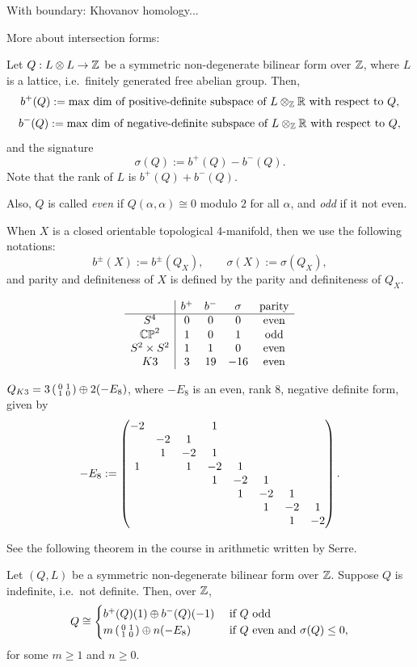 \documentclass{../../../small}
\begin{document}
With boundary: Khovanov homology...


More about intersection forms:
\begin{definition}
Let $Q:L\otimes L\to\Z$ be a symmetric non-degenerate bilinear form over $\Z$, where $L$ is a lattice, i.e.~finitely generated free abelian group.
Then,
\[b^+(Q):=\text{max dim of positive-definite subspace of $L\otimes_\Z\R$ with respect to $Q$},\]
\[b^-(Q):=\text{max dim of negative-definite subspace of $L\otimes_\Z\R$ with respect to $Q$},\]
and the signature
\[\sigma(Q):=b^+(Q)-b^-(Q).\]
Note that the rank of $L$ is $b^+(Q)+b^-(Q)$.

Also, $Q$ is called \emph{even} if $Q(\alpha,\alpha)\cong0$ modulo $2$ for all $\alpha$, and \emph{odd} if it not even.

When $X$ is a closed orientable topological 4-manifold, then we use the following notations:
\[b^\pm(X):=b^\pm(Q_X),\qquad\sigma(X):=\sigma(Q_X),\]
and parity and definiteness of $X$ is defined by the parity and definiteness of $Q_X$.
\end{definition}

\begin{example}
\[\begin{array}{c|cccc}
&b^+&b^-&\sigma&\text{parity}\\\hline
S^4&0&0&0&\text{even}\\
\CP^2&1&0&1&\text{odd}\\
S^2\times S^2&1&1&0&\text{even}\\
K3&3&19&-16&\text{even}
\end{array}\]
\end{example}

\begin{exercise}
$Q_{K3}=3\left(\mat[small]{0&1\\1&0}\right)\oplus2(-E_8)$, where $-E_8$ is an even, rank 8, negative definite form, given by
\[-E_8:=\mat{
-2&&&1&&&&\\
&-2&1&&&&&\\
&1&-2&1&&&&\\
1&&1&-2&1&&&\\
&&&1&-2&1&&\\
&&&&1&-2&1&\\
&&&&&1&-2&1\\
&&&&&&1&-2
}.\]
\end{exercise}
See the following theorem in the course in arithmetic written by Serre.
\begin{theorem}
Let $(Q,L)$ be a symmetric non-degenerate bilinear form over $\Z$.
Suppose $Q$ is indefinite, i.e.~not definite.
Then, over $\Z$,
\[Q\cong\begin{cases}
b^+(Q)(1)\oplus b^-(Q)(-1)&\text{ if $Q$ odd}\\
m\left(\mat[small]{0&1\\1&0}\right)\oplus n(-E_8)&\text{ if $Q$ even and $\sigma(Q)\le0$},
\end{cases}\]
for some $m\ge1$ and $n\ge0$.
\end{theorem}
\end{document}

